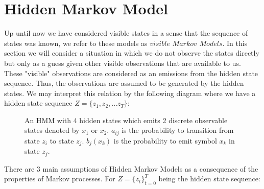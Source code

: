 \section{Hidden Markov Model}

Up until now we have considered visible states in a sense that the sequence of states was known, we refer to these models as $visible$ $Markov$ $Models$. In this section we will consider a situation in which we do not observe the states directly but only as a guess given other visible observations that are available to us. These "visible" observations are considered as an emissions from the hidden state sequence. Thus, the observations are assumed to be generated by the hidden states. We may interpret this relation by the following diagram where we have a hidden state sequence $Z = \{z_1, z_2,...z_T\}$:

\begin{figure}[htbp]
\begin{center}
\end{center}
\caption{An HMM with 4 hidden states which emits 2 discrete observable states denoted by $x_1$ or $x_2$.
$a_{ij}$ is the probability to transition from state $z_i$ to state $z_j$.
$b_j(x_k)$ is the probability to emit symbol $x_k$ in state $z_j$.}
\end{figure}

There are 3 main assumptions of Hidden Markov Models as a consequence of the properties of Markov processes. For $Z = \{z_t\}_{t=0}^T$ being the hidden state sequence:

